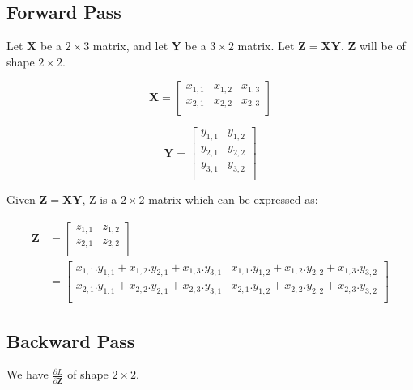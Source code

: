 \documentclass{article}
\newcommand{\matr}[1]{\mathbf{#1}} %
\begin{document}
\subsection{Forward Pass}
Let $\matr{X}$ be a $2 \times 3$ matrix, and let $\matr{Y}$ be a $3 \times 2$ matrix. Let $\matr{Z} = \matr{X}\matr{Y}$. $\matr{Z}$ will be of shape $2 \times 2$.

\begin{displaymath}
\matr{X} =
\begin{bmatrix}
x_{1,1} & x_{1,2} & x_{1,3} \\%
x_{2,1} & x_{2,2} & x_{2,3} \\%
\end{bmatrix}
\end{displaymath}

\begin{displaymath}
\matr{Y} =
\begin{bmatrix}
y_{1,1} & y_{1,2} \\%
y_{2,1} & y_{2,2} \\%
y_{3,1} & y_{3,2} \\%
\end{bmatrix}
\end{displaymath}

Given $\matr{Z} = \matr{X}\matr{Y}$, Z is a $2 \times 2$ matrix which can be expressed as:

\begin{align}
\matr{Z} &= \begin{bmatrix}
z_{1,1} & z_{1,2}\\[0.5em]
z_{2,1} & z_{2,2}\\[0.5em]
\end{bmatrix}
\\
&=
\begin{bmatrix}
x_{1,1}.y_{1,1} + x_{1,2}.y_{2,1} + x_{1,3}.y_{3,1} & x_{1,1}.y_{1,2} + x_{1,2}.y_{2,2} + x_{1,3}.y_{3,2}\\[0.5em]
x_{2,1}.y_{1,1} + x_{2,2}.y_{2,1} + x_{2,3}.y_{3,1} & x_{2,1}.y_{1,2} + x_{2,2}.y_{2,2} + x_{2,3}.y_{3,2}\\[0.5em]
\end{bmatrix}
\end{align}

\subsection{Backward Pass}
We have $\frac{\partial L}{\partial \matr{Z}}$ of shape $2 \times 2$.
\end{document}
